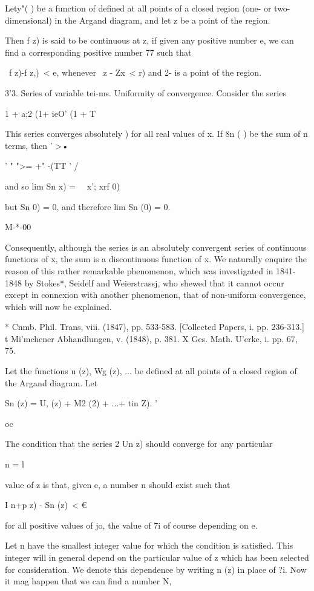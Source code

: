 Lety"( ) be a function of defined at all points of a closed region
(one- or two-dimensional) in the Argand diagram, and let z be a point
of the region.

Then f z) is said to be continuous at z, if given any positive number
e, we can find a corresponding positive number 77 such that

\ f z)-f z,)\ < e, whenever \ z - Zx\ < r) and 2- is a point of the
region.

3'3. Series of variable tei-ms. Uniformity of convergence. Consider
the series

  1 + a;2 (1+ ieO' (1 + T

This series converges absolutely ) for all real values of x. If
8n ( ) be the sum of n terms, then ' >•

' " ">= +" -(TT ' /

and so lim Sn x) = \ \ x'; xrf 0)

but Sn 0) = 0, and therefore lim Sn (0) = 0.

M-*-00

Consequently, although the series is an absolutely convergent series
of continuous functions of x, the sum is a discontinuous function of
x. We naturally enquire the reason of this rather remarkable
phenomenon, which was investigated in 1841-1848 by Stokes*, Seidelf
and Weierstrassj, who shewed that it cannot occur except in connexion
with another phenomenon, that of non-uniform convergence, which will
now be explained.

* Cnmb. Phil. Trans, viii. (1847), pp. 533-583. [Collected Papers, i.
pp. 236-313.] t Mi'mchener Abhandlungen, v. (1848), p. 381. X Ges.
Math. U'erke, i. pp. 67, 75.

%
%

Let the functions u (z), Wg (z), ... be defined at all points of a
closed region of the Argand diagram. Let

Sn (z) = U, (z) + M2 (2) + ...+ tin Z). '

oc

The condition that the series 2 Un z) should converge for any
particular

n = l

value of z is that, given e, a number n should exist such that

I n+p z) - Sn (z)\ < €

for all positive values of jo, the value of 7i of course depending on
e.

Let n have the smallest integer value for which the condition is
satisfied. This integer will in general depend on the particular value
of z which has been selected for consideration. We denote this
dependence by writing n (z) in place of ?i. Now it mag happen that we
can find a number N,

